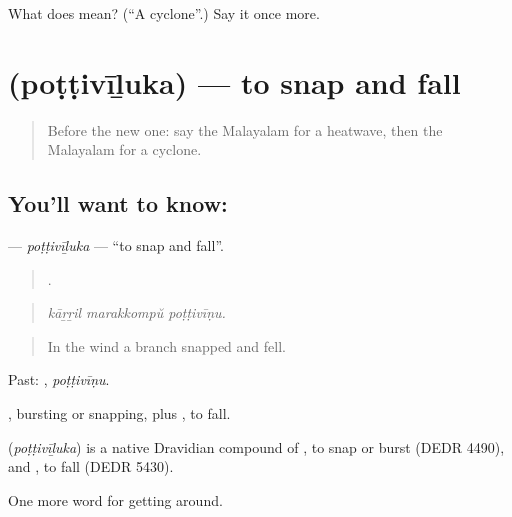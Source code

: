 \begin{tcolorbox}[breakable,colback=teal!4,colframe=teal!35!black,title={Before you move on}]
What does  mean? (\textquotedblleft{}A cyclone\textquotedblright{}.) Say it once more.
\end{tcolorbox}
\section[\texorpdfstring{\ml{പൊട്ടിവീഴുക} (poṭṭivīḻuka)}{പൊട്ടിവീഴുക (poṭṭivīḻuka)}]{ (poṭṭivīḻuka) — to snap and fall}

\label{lesson:ML-C511-pottiviluka}



\begin{quote}
Before the new one: say the Malayalam for a heatwave, then the Malayalam for a cyclone.
\end{quote}

\subsection*{You'll want to know: }
\textbf{} — \emph{poṭṭivīḻuka} — \textquotedblleft{}to snap and fall\textquotedblright{}.

\begin{quote}
  .
\end{quote}

\begin{quote}
\emph{kāṟṟil marakkompŭ poṭṭivīṇu.}
\end{quote}

\begin{quote}
In the wind a branch snapped and fell.
\end{quote}

Past: , \emph{poṭṭivīṇu}.

, bursting or snapping, plus , to fall.

\begin{cousinweb}
\textbf{} (\emph{poṭṭivīḻuka}) is a native Dravidian compound of , to snap or burst (DEDR 4490), and , to fall (DEDR 5430).
\end{cousinweb}

\begin{grammarlens}[title={What you've built}]
One more word for getting around.
\end{grammarlens}


